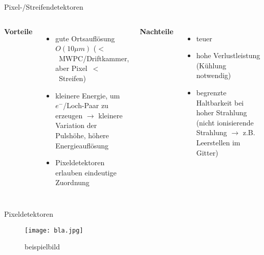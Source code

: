 \begin{frame}{Pixel-/Streifendetektoren}
    \begin{columns}[T]
			\textbf{Vorteile}		
			\begin{itemize}
			  \item gute Ortsauflösung $O(10\mu m)$  ($<$~MWPC/Driftkammer, aber Pixel~$<$~Streifen)
			  \item kleinere Energie, um $e^-$/Loch-Paar zu erzeugen $\rightarrow$ kleinere Variation der
			  Pulshöhe, höhere Energieauflösung
			  \item Pixeldetektoren erlauben eindeutige Zuordnung
			\end{itemize}	
	    	\textbf{Nachteile}
	    	\begin{itemize}
			  \item teuer
			  \item hohe Verlustleistung (Kühlung notwendig)
			  \item begrenzte Haltbarkeit bei hoher Strahlung (nicht ionisierende Strahlung $\rightarrow$
			  z.B. Leerstellen im Gitter)
			\end{itemize}
    \end{columns}
   \end{frame}
   
   \begin{frame}{Pixeldetektoren}
			\begin{figure}[htbp]
			  \centering
			  \texttt{[image: bla.jpg]}
			  \caption{beispielbild}
			\end{figure}
\end{frame}